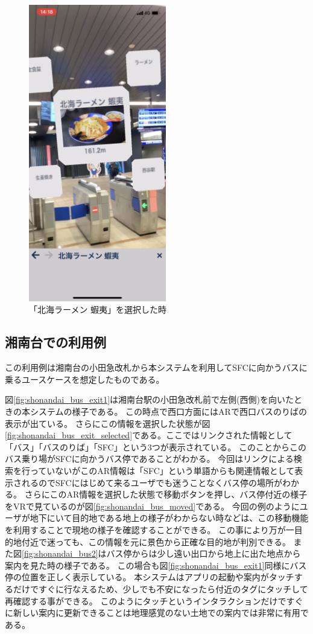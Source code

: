 \begin{figure}[h]
  \centering
  \includegraphics[width=60mm]{images/nishiya_ezo_ar.png}
  \caption{「北海ラーメン 蝦夷」を選択した時} \label{fig:nishiya_ezo_ar}
\end{figure}


\subsection{湘南台での利用例}
この利用例は湘南台の小田急改札から本システムを利用してSFCに向かうバスに乗るユースケースを想定したものである。

図\ref{fig:shonandai_bus_exit1}は湘南台駅の小田急改札前で左側(西側)を向いたときの本システムの様子である。
この時点で西口方面にはARで西口バスのりばの表示が出ている。
さらにこの情報を選択した状態が図\ref{fig:shonandai_bus_exit_selected}である。ここではリンクされた情報として「バス」「バスのりば」「SFC」という3つが表示されている。
このことからこのバス乗り場がSFCに向かうバス停であることがわかる。
今回はリンクによる検索を行っていないがこのAR情報は「SFC」という単語からも関連情報として表示されるのでSFCにはじめて来るユーザでも迷うことなくバス停の場所がわかる。
さらにこのAR情報を選択した状態で移動ボタンを押し、バス停付近の様子をVRで見ているのが図\ref{fig:shonandai_bus_moved}である。
今回の例のようにユーザが地下にいて目的地である地上の様子がわからない時などは、この移動機能を利用することで現地の様子を確認することができる。
この事により万が一目的地付近で迷っても、この情報を元に景色から正確な目的地が判別できる。
また図\ref{fig:shonandai_bus2}はバス停からは少し遠い出口から地上に出た地点から案内を見た時の様子である。
この場合も図\ref{fig:shonandai_bus_exit1}同様にバス停の位置を正しく表示している。
本システムはアプリの起動や案内がタッチするだけですぐに行なえるため、少しでも不安になったら付近のタグにタッチして再確認する事ができる。
このようにタッチというインタラクションだけですぐに新しい案内に更新できることは地理感覚のない土地での案内では非常に有用である。


